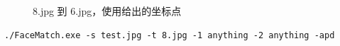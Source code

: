 \documentclass[11pt,a4paper]{ctexart}
\begin{document}
\begin{figure}[!htp]
\begin{center}
    \end{center}
    \caption{8.jpg 到 6.jpg，使用给出的坐标点}
    \label{fig:p1}
\end{figure}

\clearpage

\begin{lstlisting}[frame=single]
./FaceMatch.exe -s test.jpg -t 8.jpg -1 anything -2 anything -apd
\end{lstlisting}
\end{document}
